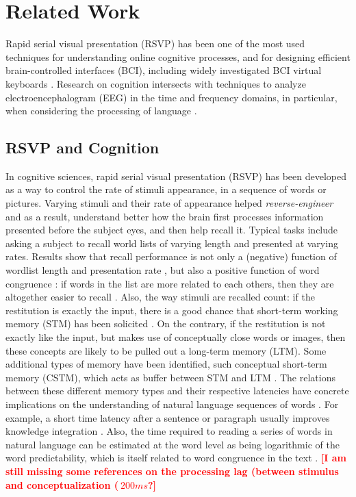 \section{Related Work}
\label{related_work}
Rapid serial visual presentation (RSVP) has been one of the most used techniques for understanding online cognitive processes, and for designing efficient brain-controlled interfaces (BCI), including widely investigated BCI virtual keyboards \cite{}. Research on cognition intersects with techniques to analyze electroencephalogram (EEG) in the time and frequency domains, in particular, when considering the processing of language \cite{}. 

\subsection{RSVP and Cognition}
In cognitive sciences, rapid serial visual presentation (RSVP) has been developed as a way to control the rate of stimuli appearance, in a sequence of words or pictures. Varying stimuli and their rate of appearance helped {\it reverse-engineer} and as a result, understand better how the brain first processes information presented before the subject eyes, and then help recall it. Typical tasks include asking a subject to recall world lists of varying length and presented at varying rates. Results show that recall performance is not only a (negative) function of wordlist length and presentation rate \cite{}, but also a positive function of word congruence \cite{}: if words in the list are more related to each others, then they are altogether easier to recall \cite{}. Also, the way stimuli are recalled count: if the restitution is exactly the input, there is a good chance that  short-term working memory (STM) has been solicited \cite{}. On the contrary, if the restitution is not exactly like the input, but makes use of conceptually close words or images, then these concepts are likely to be pulled out a long-term memory (LTM). Some additional types of memory have been identified, such conceptual short-term memory (CSTM), which acts as buffer between STM and LTM \cite{potter1993very}. The relations between these different memory types and their respective latencies have concrete implications on the understanding of natural language sequences of words \cite{potter1984rapid}. For example, a short time latency after a sentence or paragraph usually improves knowledge integration \cite{see review by potter}. Also, the time required to reading a series of words in natural language can be estimated at the word level as being logarithmic of the word predictability, which is itself related to word congruence in the text \cite{smith2013effect}. \textcolor{red}{\bf [I am still missing some references on the processing lag (between stimulus and conceptualization ($~200ms$?]}

